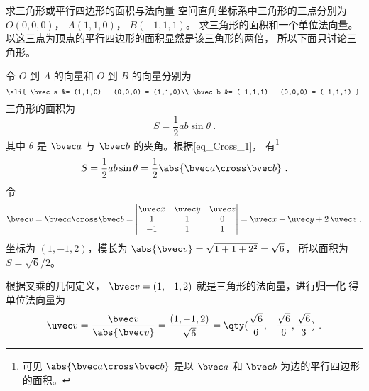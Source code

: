 \begin{example}{求三角形或平行四边形的面积与法向量}\label{ex_Cross_1}
空间直角坐标系中三角形的三点分别为 $O(0,0,0)$，  $A(1,1,0)$，  $B(-1,1,1)$。 求三角形的面积和一个单位法向量。 以这三点为顶点的平行四边形的面积显然是该三角形的两倍， 所以下面只讨论三角形。

令 $O$ 到 $A$ 的向量和  $O$ 到 $B$ 的向量分别为
\begin{equation}
\ali{
\bvec a  &= (1,1,0) - (0,0,0) = (1,1,0)\\
\bvec b  &= (-1,1,1) - (0,0,0) = (-1,1,1)
}~\end{equation}
三角形的面积为
 \begin{equation}
S = \frac12 ab \sin \theta ~.
\end{equation}
其中 $\theta $ 是 $\bvec a$ 与 $\bvec b$ 的夹角。根据\autoref{eq_Cross_1}， 有\footnote{可见 $\abs{\bvec a\cross\bvec b}$ 是以 $\bvec a$ 和 $\bvec b$ 为边的平行四边形的面积。}
\begin{equation}
S = \frac12 ab \sin \theta  = \frac12 \abs{\bvec a\cross\bvec b}~.
\end{equation}
令
\begin{equation}
\bvec v = \bvec a \cross \bvec b = 
\begin{vmatrix} \uvec x & \uvec y & \uvec z \\ 1&1&0\\-1&1&1 \end{vmatrix}
= \uvec x - \uvec y + 2\,\uvec z ~.
\end{equation}
坐标为 $(1,-1,2)$，模长为 $\abs{\bvec v} = \sqrt{1 + 1 + 2^2} = \sqrt 6$， 所以面积为 $S = \sqrt 6 /2$。 

根据叉乘的几何定义， $\bvec v = (1,-1,2)$ 就是三角形的法向量，进行\textbf{归一化}
得单位法向量为
 \begin{equation}
\uvec v = \frac{\bvec v}{\abs{\bvec v}} = \frac{(1,-1,2)}{\sqrt 6} = \qty( \frac{\sqrt 6 }{6}, - \frac{\sqrt 6 }{6}, \frac{\sqrt 6 }{3} )~.
\end{equation}
\end{example}

